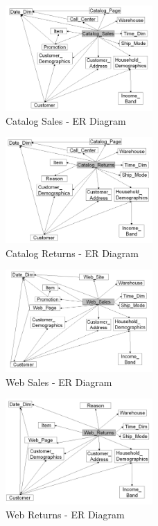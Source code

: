 \documentclass[conference]{IEEEtran}
\begin{document}
\begin{figure}[h]
    \centering
    \includegraphics[width=0.5\textwidth]{images/ER_Diagrams/Catalog Sales - ER Diagram.png}
    \caption{Catalog Sales - ER Diagram}
    \label{fig:catalog_sales_er_diagram}
\end{figure}

\begin{figure}[h]
    \centering
    \includegraphics[width=0.5\textwidth]{images/ER_Diagrams/Catalog Returns - ER Diagram.png}
    \caption{Catalog Returns - ER Diagram}
    \label{fig:catalog_returns_er_diagram}
\end{figure}


\begin{figure}[h]
    \centering
    \includegraphics[width=0.5\textwidth]{images/ER_Diagrams/Web Sales - ER Diagram.png}
    \caption{Web Sales - ER Diagram}
    \label{fig:web_sales_er_diagram}
\end{figure}

\begin{figure}[h]
    \centering
    \includegraphics[width=0.5\textwidth]{images/ER_Diagrams/Web Returns - ER Diagram.png}
    \caption{Web Returns - ER Diagram}
    \label{fig:web_returns_er_diagram}
\end{figure}
\end{document}

